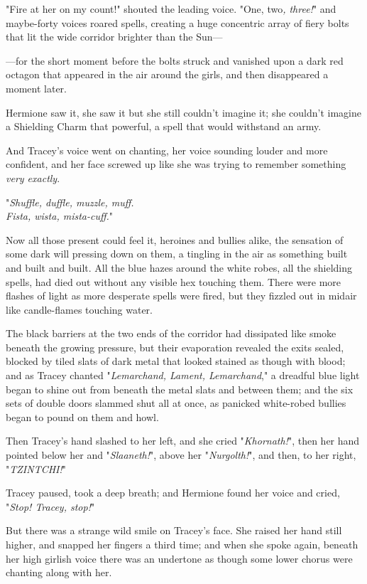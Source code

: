"Fire at her on my count!" shouted the leading voice. "One, two\emph{, three!}"
and maybe-forty voices roared spells, creating a huge concentric array of fiery
bolts that lit the wide corridor brighter than the Sun—

—for the short moment before the bolts struck and vanished upon a dark red
octagon that appeared in the air around the girls, and then disappeared a
moment later.

Hermione saw it, she saw it but she still couldn't imagine it; she couldn't
imagine a Shielding Charm that powerful, a spell that would withstand an army.

And Tracey's voice went on chanting, her voice sounding louder and more
confident, and her face screwed up like she was trying to remember something
\emph{very exactly}.

"\emph{Shuffle, duffle, muzzle, muff.\\
Fista, wista, mista-cuff.}"

Now all those present could feel it, heroines and bullies alike, the sensation
of some dark will pressing down on them, a tingling in the air as something
built and built and built. All the blue hazes around the white robes, all the
shielding spells, had died out without any visible hex touching them. There
were more flashes of light as more desperate spells were fired, but they
fizzled out in midair like candle-flames touching water.

The black barriers at the two ends of the corridor had dissipated like smoke
beneath the growing pressure, but their evaporation revealed the exits sealed,
blocked by tiled slats of dark metal that looked stained as though with blood;
and as Tracey chanted "\emph{Lemarchand, Lament, Lemarchand}," a dreadful blue
light began to shine out from beneath the metal slats and between them; and the
six sets of double doors slammed shut all at once, as panicked white-robed
bullies began to pound on them and howl.

Then Tracey's hand slashed to her left, and she cried "\emph{Khornath!}", then
her hand pointed below her and "\emph{Slaaneth!}", above her
"\emph{Nurgolth!}", and then, to her right, "\emph{TZINTCHI!}"

Tracey paused, took a deep breath; and Hermione found her voice and cried,
"\emph{Stop! Tracey, stop!}"

But there was a strange wild smile on Tracey's face. She raised her hand still
higher, and snapped her fingers a third time; and when she spoke again, beneath
her high girlish voice there was an undertone as though some lower chorus were
chanting along with her.

